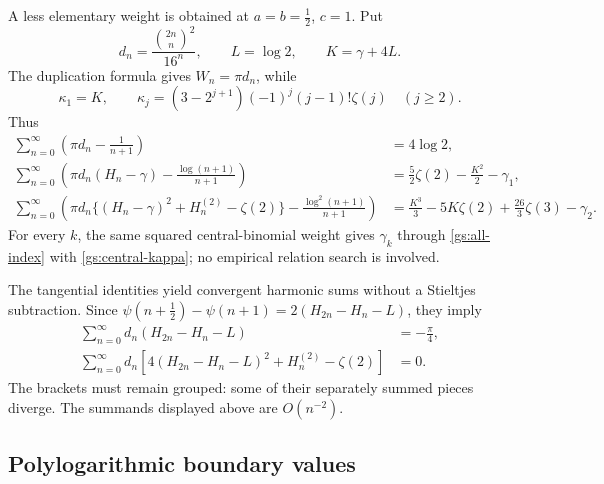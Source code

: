A less elementary weight is obtained at $a=b=\tfrac12$, $c=1$.
Put
\[
 d_n=\frac{\binom{2n}{n}^2}{16^n},\qquad
 L=\log2,\qquad K=\gamma+4L.
\]
The duplication formula gives $W_n=\pi d_n$, while
\begin{equation}\label{gs:central-kappa}
 \kappa_1=K,\qquad
 \kappa_j=(3-2^{j+1})(-1)^j(j-1)!\zeta(j)\quad(j\ge2).
\end{equation}
Thus
\begin{align}
 \sum_{n=0}^{\infty}\left(\pi d_n-\frac1{n+1}\right)
 &=4\log2,\label{gs:central0}\\
 \sum_{n=0}^{\infty}\left(
 \pi d_n(H_n-\gamma)-\frac{\log(n+1)}{n+1}\right)
 &=\frac52\zeta(2)-\frac{K^2}2-\gamma_1,\label{gs:central1}\\
 \sum_{n=0}^{\infty}\left(
 \pi d_n\{(H_n-\gamma)^2+H_n^{(2)}-\zeta(2)\}
 -\frac{\log^2(n+1)}{n+1}\right)
 &=\frac{K^3}{3}-5K\zeta(2)+\frac{26}{3}\zeta(3)-\gamma_2.
 \label{gs:central2}
\end{align}
For every $k$, the same squared central-binomial weight gives
$\gamma_k$ through \eqref{gs:all-index} with
\eqref{gs:central-kappa}; no empirical relation search is involved.

The tangential identities yield convergent harmonic sums without a
Stieltjes subtraction.  Since
$\psi(n+\tfrac12)-\psi(n+1)=2(H_{2n}-H_n-L)$, they imply
\begin{align}
 \sum_{n=0}^{\infty}d_n(H_{2n}-H_n-L)&=-\frac\pi4,
 \label{gs:central-linear}\\
 \sum_{n=0}^{\infty}d_n\left[
 4(H_{2n}-H_n-L)^2+H_n^{(2)}-\zeta(2)\right]&=0.
 \label{gs:central-quadratic}
\end{align}
The brackets must remain grouped: some of their separately summed
pieces diverge.  The summands displayed above are $O(n^{-2})$.

\subsection{Polylogarithmic boundary values}

